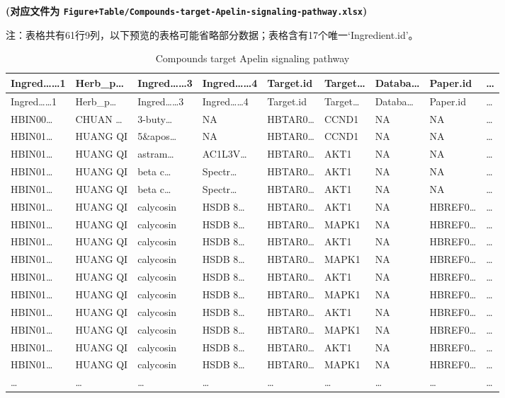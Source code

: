 \documentclass[
]{article}
\begin{document}
\textbf{(对应文件为 \texttt{Figure+Table/Compounds-target-Apelin-signaling-pathway.xlsx})}

\begin{center}\begin{tcolorbox}[colback=gray!10, colframe=gray!50, width=0.9\linewidth, arc=1mm, boxrule=0.5pt]注：表格共有61行9列，以下预览的表格可能省略部分数据；表格含有17个唯一`Ingredient.id'。
\end{tcolorbox}
\end{center}

\begin{longtable}[]{@{}lllllllll@{}}
\caption{\label{tab:Compounds-target-Apelin-signaling-pathway}Compounds target Apelin signaling pathway}\tabularnewline
\toprule
Ingred\ldots\ldots1 & Herb\_p\ldots{} & Ingred\ldots\ldots3 & Ingred\ldots\ldots4 & Target.id & Target\ldots{} & Databa\ldots{} & Paper.id & \ldots{}\tabularnewline
\midrule
\endfirsthead
\toprule
Ingred\ldots\ldots1 & Herb\_p\ldots{} & Ingred\ldots\ldots3 & Ingred\ldots\ldots4 & Target.id & Target\ldots{} & Databa\ldots{} & Paper.id & \ldots{}\tabularnewline
\midrule
\endhead
HBIN00\ldots{} & CHUAN \ldots{} & 3-buty\ldots{} & NA & HBTAR0\ldots{} & CCND1 & NA & NA & \ldots{}\tabularnewline
HBIN01\ldots{} & HUANG QI & 5\&apos\ldots{} & NA & HBTAR0\ldots{} & CCND1 & NA & NA & \ldots{}\tabularnewline
HBIN01\ldots{} & HUANG QI & astram\ldots{} & AC1L3V\ldots{} & HBTAR0\ldots{} & AKT1 & NA & NA & \ldots{}\tabularnewline
HBIN01\ldots{} & HUANG QI & beta c\ldots{} & Spectr\ldots{} & HBTAR0\ldots{} & AKT1 & NA & NA & \ldots{}\tabularnewline
HBIN01\ldots{} & HUANG QI & beta c\ldots{} & Spectr\ldots{} & HBTAR0\ldots{} & AKT1 & NA & NA & \ldots{}\tabularnewline
HBIN01\ldots{} & HUANG QI & calycosin & HSDB 8\ldots{} & HBTAR0\ldots{} & AKT1 & NA & HBREF0\ldots{} & \ldots{}\tabularnewline
HBIN01\ldots{} & HUANG QI & calycosin & HSDB 8\ldots{} & HBTAR0\ldots{} & MAPK1 & NA & HBREF0\ldots{} & \ldots{}\tabularnewline
HBIN01\ldots{} & HUANG QI & calycosin & HSDB 8\ldots{} & HBTAR0\ldots{} & AKT1 & NA & HBREF0\ldots{} & \ldots{}\tabularnewline
HBIN01\ldots{} & HUANG QI & calycosin & HSDB 8\ldots{} & HBTAR0\ldots{} & MAPK1 & NA & HBREF0\ldots{} & \ldots{}\tabularnewline
HBIN01\ldots{} & HUANG QI & calycosin & HSDB 8\ldots{} & HBTAR0\ldots{} & AKT1 & NA & HBREF0\ldots{} & \ldots{}\tabularnewline
HBIN01\ldots{} & HUANG QI & calycosin & HSDB 8\ldots{} & HBTAR0\ldots{} & MAPK1 & NA & HBREF0\ldots{} & \ldots{}\tabularnewline
HBIN01\ldots{} & HUANG QI & calycosin & HSDB 8\ldots{} & HBTAR0\ldots{} & AKT1 & NA & HBREF0\ldots{} & \ldots{}\tabularnewline
HBIN01\ldots{} & HUANG QI & calycosin & HSDB 8\ldots{} & HBTAR0\ldots{} & MAPK1 & NA & HBREF0\ldots{} & \ldots{}\tabularnewline
HBIN01\ldots{} & HUANG QI & calycosin & HSDB 8\ldots{} & HBTAR0\ldots{} & AKT1 & NA & HBREF0\ldots{} & \ldots{}\tabularnewline
HBIN01\ldots{} & HUANG QI & calycosin & HSDB 8\ldots{} & HBTAR0\ldots{} & MAPK1 & NA & HBREF0\ldots{} & \ldots{}\tabularnewline
\ldots{} & \ldots{} & \ldots{} & \ldots{} & \ldots{} & \ldots{} & \ldots{} & \ldots{} & \ldots{}\tabularnewline
\bottomrule
\end{longtable}
\end{document}
